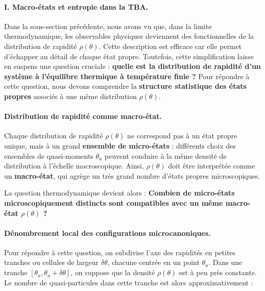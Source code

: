 \paragraph{I. Macro-états et entropie dans la TBA.}


Dans la sous-section précédente, nous avons vu que, dans la limite thermodynamique, les observables physiques deviennent des fonctionnelles de la distribution de rapidité $\rho(\theta)$. Cette description est efficace car elle permet d’échapper au détail de chaque état propre. Toutefois, cette simplification laisse en suspens une question cruciale : {\bf quelle est la distribution de rapidité d’un système à l'équilibre thermique à température finie ?} Pour répondre à cette question, nous devons comprendre la {\bf structure statistique des états propres} associés à une même distribution $\rho(\theta)$.

\paragraph{Distribution de rapidité comme macro-état.}

Chaque distribution de rapidité $\rho(\theta)$ ne correspond pas à un état propre unique, mais à un grand {\bf ensemble de micro-états} : différents choix des ensembles de quasi-moments ${\theta_a}$ peuvent conduire à la même densité de distribution à l’échelle macroscopique. Ainsi, $\rho(\theta)$ doit être interprétée comme un {\bf macro-état}, qui agrège un très grand nombre d’états propres microscopiques.

La question thermodynamique devient alors : {\bf Combien de micro-états microscopiquement distincts sont compatibles avec un même macro-état $\rho(\theta)$ ?} 

\paragraph{Dénombrement local des configurations microcanoniques.}
Pour répondre à cette question, on subdivise l’axe des rapidités en petites tranches ou cellules de largeur $\delta \theta$, chacune centrée en un point $\theta_a$. Dans une tranche $[\theta_a, \theta_a + \delta\theta]$, on suppose que la densité $\rho(\theta)$ est à peu près constante. Le nombre de quasi-particules dans cette tranche est alors approximativement :

